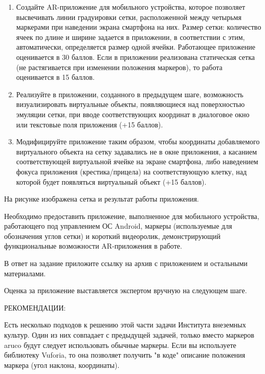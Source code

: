 
\begin{enumerate}
    \item Создайте AR-приложение для мобильного устройства, которое позволяет высвечивать линии градуировки сетки, расположенной между четырьмя маркерами при наведении экрана смартфона на них. Размер сетки: количество ячеек по длине и ширине задается в приложении, в соответствии с этим, автоматически, определяется размер одной ячейки. Работающее приложение оценивается в 30 баллов. Если в приложении реализована статическая сетка (не растягивается при изменении положения маркеров), то работа оценивается в 15 баллов.
    \item Реализуйте в приложении, созданного в предыдущем шаге, возможность визуализировать виртуальные объекты, появляющиеся над поверхностью эмуляции сетки, при вводе соответствующих координат в диалоговое окно или текстовые поля приложения (+15 баллов).
    \item Модифицируйте приложение таким образом, чтобы координаты добавляемого виртуального объекта на сетку задавались не в окне приложения, а касанием соответствующей виртуальной ячейке на экране смартфона, либо наведением фокуса приложения (крестика/прицела) на соответствующую клетку, над которой будет появляться виртуальный объект (+15 баллов).
\end{enumerate}

На рисунке изображена сетка и результат работы приложения.


Необходимо предоставить приложение, выполненное для мобильного устройства, работающего под управлением ОС Android, маркеры (используемые для обозначения углов сетки) и короткий видеоролик, демонстрирующий функциональные возможности AR-приложения в работе. 

В ответ на задание приложите ссылку на архив с приложением и остальными материалами. 

Оценка за приложение выставляется экспертом вручную на следующем шаге.

РЕКОМЕНДАЦИИ:

Есть несколько подходов к решению этой части задачи Института внеземных культур. Один из них совпадает с предыдущей задачей, только вместо маркеров aruco будут следует использовать обычные маркеры. Если вы используете библиотеку Vuforia, то она позволяет получить "в коде" описание положения маркера (угол наклона, координаты).

